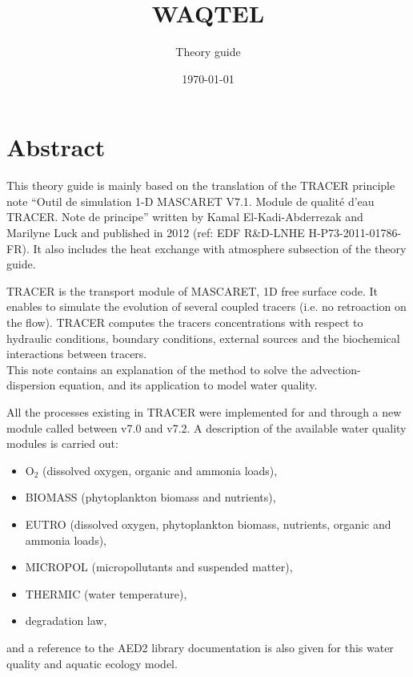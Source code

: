 \documentclass[Waqtel]{../../data/TelemacDoc} %
\begin{document}
\let\cleardoublepage\clearpage
\title{WAQTEL}
\subtitle{Theory guide}
\version{\telmaversion}
\date{\today}
\maketitle
\clearpage


\newpage

\thispagestyle{empty}

\chapter*{Abstract}
This theory guide is mainly based on the translation of the TRACER principle note
``Outil de simulation 1-D MASCARET V7.1. Module de qualité d'eau TRACER. Note de principe''
written by Kamal El-Kadi-Abderrezak and Marilyne Luck and published in 2012
\cite{elkadi_tracer_2012} (ref: EDF R\&D-LNHE H-P73-2011-01786-FR).
It also includes the heat exchange with atmosphere subsection of the  theory guide.

TRACER is the transport module of MASCARET, 1D free surface code.
It enables to simulate the evolution of several coupled tracers
(i.e. no retroaction on the flow).
TRACER computes the tracers concentrations with respect to hydraulic conditions,
boundary conditions, external sources and the biochemical interactions between tracers.\\

This note contains an explanation of the method to solve the advection-dispersion equation,
and its application to model water quality.

All the processes existing in TRACER were implemented for  and  through
a new module called \waqtel between v7.0 and v7.2.
A description of the available water quality modules is carried out:
\begin{itemize}
\item O$_2$ (dissolved oxygen, organic and ammonia loads),
\item BIOMASS (phytoplankton biomass and nutrients),
\item EUTRO (dissolved oxygen, phytoplankton biomass, nutrients, organic and ammonia loads),
\item MICROPOL (micropollutants and suspended matter),
\item THERMIC (water temperature),
\item degradation law,
\end{itemize}
and a reference to the AED2 library documentation is also given
for this water quality and aquatic ecology model.
\end{document}

